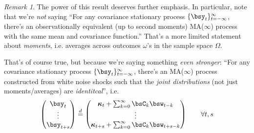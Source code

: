 \documentclass[12pt]{article}
\theoremstyle{plain}
\theoremstyle{definition}
\theoremstyle{remark}
\newtheorem*{rmk}{Remark}
\newcommand{\bskappa}{\boldsymbol{\kappa}}
\newcommand{\tinfinf}{_{t=-\infty}^\infty}
\begin{document}
\begin{rmk}
The power of this result deserves further emphasis.
In particular, note that we're \emph{not} saying ``For any covariance
stationary process $\{\bsy_t\}\tinfinf$, there's an observationally
equivalent (up to second moments) MA($\infty$) process with the same
mean and covariance function.'' That's a more limited statement about
\emph{moments}, i.e. averages across outcomes $\omega$'s in the sample
space $\Omega$.

That's of course true, but because we're saying something
\emph{even stronger}: ``For any covariance stationary process
$\{\bsy_t\}\tinfinf$, there's an MA($\infty$) process constructed from
white noise shocks such that the \emph{joint distributions} (not just
moments/averages) are \emph{identitcal}'', i.e.
\begin{align*}
  \begin{pmatrix}
    \bsy_t \\ \vdots \\ \bsy_{t+s}
  \end{pmatrix}
  \overset{d}{=}
  \begin{pmatrix}
    \bskappa_t + \sum_{k=0}^\infty \bsC_k \bsw_{t-k}
    \\ \vdots \\
    \bskappa_{t+s} + \sum_{k=0}^\infty \bsC_k \bsw_{t+s-k}
  \end{pmatrix}
  \qquad \forall t,s
\end{align*}
\end{rmk}
\end{document}
